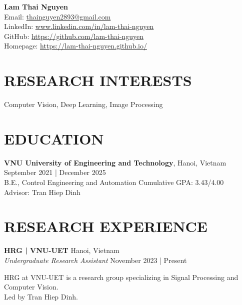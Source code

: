 \documentclass[a4paper,9pt]{extarticle}
\begin{document}
\pagestyle{fancy}
\renewcommand{\headrulewidth}{0pt}
\fancyhead{}
\fancyhead[R]{\textit{\today}}
\thispagestyle{empty} %

\begin{flushleft}
\textbf{\LARGE Lam Thai Nguyen}\\[2pt] %
Email: \href{mailto:thainguyen2893@gmail.com}{thainguyen2893@gmail.com} \\
LinkedIn: \href{https://www.linkedin.com/in/lam-thai-nguyen}{www.linkedin.com/in/lam-thai-nguyen} \\
GitHub: \href{https://github.com/lam-thai-nguyen}{https://github.com/lam-thai-nguyen}\\
Homepage: \href{https://lam-thai-nguyen.github.io/}{https://lam-thai-nguyen.github.io/}
\end{flushleft}

\section*{RESEARCH INTERESTS}
\noindent
Computer Vision, Deep Learning, Image Processing

\section*{EDUCATION}
\noindent
\textbf{VNU University of Engineering and Technology}, Hanoi, Vietnam \hfill September 2021 | December 2025\\ %
B.E., Control Engineering and Automation \hfill Cumulative GPA: 3.43/4.00 \\
Advisor: Tran Hiep Dinh \\

\section*{RESEARCH EXPERIENCE}
\noindent
\textbf{HRG | VNU-UET} \hfill Hanoi, Vietnam  \\ %
\textit{Undergraduate Research Assistant} \hfill November 2023 | Present %

\vspace{3pt}\noindent
HRG at VNU-UET is a research group specializing in Signal Processing and Computer Vision. \\ 
Led by Tran Hiep Dinh.
\end{document}
